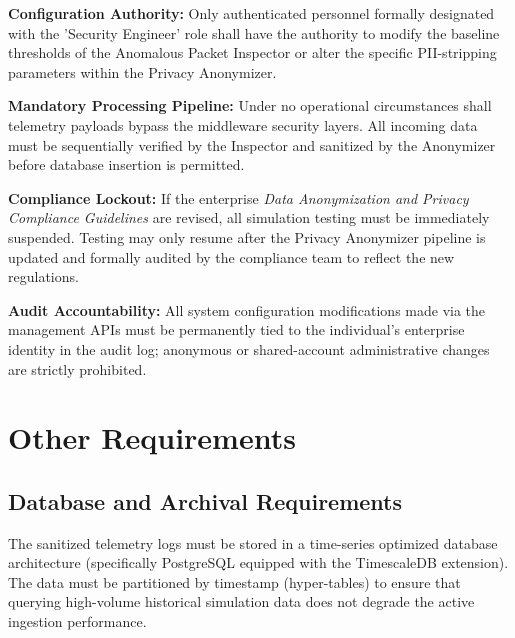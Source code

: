 \documentclass[12pt,letterpaper]{article}
\begin{document}
\vspace{0.08in}
\noindent\hspace*{0.94in} \textbf{Configuration Authority:} Only authenticated personnel formally designated with the 'Security Engineer' role shall have the authority to modify the baseline thresholds of the Anomalous Packet Inspector or alter the specific PII-stripping parameters within the Privacy Anonymizer.\par
\vspace{0.04in}
\noindent\hspace*{0.94in} \textbf{Mandatory Processing Pipeline:} Under no operational circumstances shall telemetry payloads bypass the middleware security layers. All incoming data must be sequentially verified by the Inspector and sanitized by the Anonymizer before database insertion is permitted.\par
\vspace{0.04in}
\noindent\hspace*{0.94in} \textbf{Compliance Lockout:} If the enterprise \emph{Data Anonymization and Privacy Compliance Guidelines} are revised, all simulation testing must be immediately suspended. Testing may only resume after the Privacy Anonymizer pipeline is updated and formally audited by the compliance team to reflect the new regulations.\par
\vspace{0.04in}
\noindent\hspace*{0.94in} \textbf{Audit Accountability:} All system configuration modifications made via the management APIs must be permanently tied to the individual's enterprise identity in the audit log; anonymous or shared-account administrative changes are strictly prohibited.\par
\clearpage
\section{Other Requirements}
\subsection{Database and Archival Requirements}
The sanitized telemetry logs must be stored in a time-series optimized database architecture (specifically PostgreSQL equipped with the TimescaleDB extension). The data must be partitioned by timestamp (hyper-tables) to ensure that querying high-volume historical simulation data does not degrade the active ingestion performance.
\end{document}

